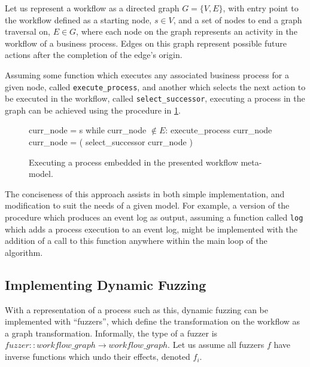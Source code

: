 \documentclass[12pt]{llncs}  %
\begin{document}
Let us represent a workflow as a directed graph $G=\{V, E\}$, with entry point
to the workflow defined as a starting node, $s \in{} V$, and a set of nodes to end
a graph traversal on, $E \in G$, where each node on the graph
represents an activity in the workflow of a business process. Edges on this
graph represent possible future actions after the completion of the edge's origin.
\par

Assuming some function which executes any associated business process for a
given node, called \texttt{execute\_process}, and another which selects the next
action to be executed in the workflow, called \texttt{select\_successor},
executing a process in the graph can be achieved using the procedure in
\cref{fig:simple_graph_traversal}.
\par

\begin{figure}[h]
  \begin{algorithm}
    curr_node = s
    while curr_node $\notin{} E$:
        execute_process curr_node
        curr_node = ( select_successor curr_node )
  \end{algorithm}
  \caption[Simple implementation of navigating the graph]{Executing a process
    embedded in the presented workflow meta-model.}
  \label{fig:simple_graph_traversal}
\end{figure}

The conciseness of this approach assists in both simple
implementation, and modification to suit the needs of a given model. For
example, a version of the procedure which produces an event log as output,
assuming a function called \texttt{log} which adds a process execution to an
event log, might be implemented with the addition of a call to this function
anywhere within the main loop of the algorithm.


\subsection{Implementing Dynamic Fuzzing}
\label{subsec:example_implementation_details}
With a representation of a process such as this, dynamic fuzzing can be
implemented with ``fuzzers'', which define the transformation on the workflow as
a graph transformation. Informally, the type of a fuzzer is $fuzzer ::
workflow\_graph \rightarrow workflow\_graph$. Let us assume all fuzzers $f$ have
inverse functions which undo their effects, denoted $f_i$.
\par
\end{document}
